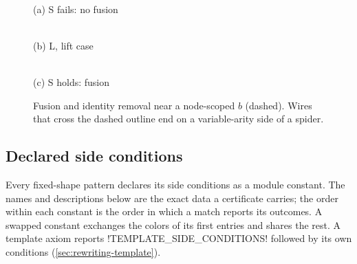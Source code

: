 \begin{figure}[htbp]
\centering
\begin{minipage}[b]{0.3\textwidth}\centering
{}\\(a) S fails: no fusion
\end{minipage}\hfill
\begin{minipage}[b]{0.3\textwidth}\centering
{}\\(b) L, lift case
\end{minipage}\hfill
\begin{minipage}[b]{0.3\textwidth}\centering
{}\\(c) S holds: fusion
\end{minipage}
\caption{Fusion and identity removal near a node-scoped \bbox{} $b$ (dashed). Wires that cross
the dashed outline end on a variable-arity side of a spider.}
\label{fig:rewriting-boxcond}
\end{figure}

\subsection{Declared side conditions}\label{sec:rewriting-declared}

Every fixed-shape pattern declares its side conditions as a module constant. The names and
descriptions below are the exact data a certificate carries; the order within each constant is
the order in which a match reports its outcomes. A swapped constant exchanges the colors of its
first entries and shares the rest. A template axiom reports \py!TEMPLATE_SIDE_CONDITIONS! followed
by its own conditions (\cref{sec:rewriting-template}).

